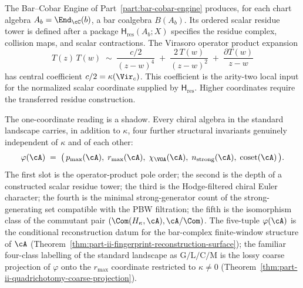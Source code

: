 The Bar--Cobar Engine of Part~\ref{part:bar-cobar-engine} produces, for
each chart algebra $A_b = \End_\cC(b)$, a bar coalgebra $B(A_b)$.
Its ordered scalar residue tower is defined after a package
$\mathsf H_{\mathrm{res}}(A_b;X)$ specifies the residue complex,
collision maps, and scalar contractions.  The Virasoro operator
product expansion
\begin{equation}
 T(z)\,T(w) \;\sim\; \frac{c/2}{(z-w)^4}
 \;+\; \frac{2\,T(w)}{(z-w)^2}
 \;+\; \frac{\partial T(w)}{z-w}
\end{equation}
has central coefficient $c/2=\kappa(\Vir_c)$.  This coefficient is the
arity-two local input for the normalized scalar coordinate supplied by
$\mathsf H_{\mathrm{res}}$.  Higher coordinates require the transferred
residue construction.

The one-coordinate reading is a shadow. Every chiral algebra in
the standard landscape carries, in addition to $\kappa$, four
further structural invariants genuinely independent of $\kappa$ and
of each other:
\begin{equation}
 \varphi(\cA) \;=\; \bigl(\,p_{\max}(\cA),\; r_{\max}(\cA),\;
 \chi_{\VOA}(\cA),\; n_{\mathrm{strong}}(\cA),\;
 \mathrm{coset}(\cA)\,\bigr).
 \label{eq:part-ii-fingerprint}
\end{equation}
The first slot is the operator-product pole order; the second is
the depth of a constructed scalar residue tower; the third is the
Hodge-filtered chiral Euler character;
the fourth is the minimal strong-generator count of the
strong-generating set compatible with the PBW filtration; the fifth
is the isomorphism class of the commutant pair
$(\Com(H_\kappa, \cA), \cA/\Com)$. The five-tuple $\varphi(\cA)$
is the conditional reconstruction datum for the bar-complex
finite-window structure of $\cA$
(Theorem~\ref{thm:part-ii-fingerprint-reconstruction-surface}); the
familiar four-class labelling of the standard landscape as
$\mathrm{G}/\mathrm{L}/\mathrm{C}/\mathrm{M}$ is the lossy coarse
projection of $\varphi$ onto the $r_{\max}$ coordinate restricted
to $\kappa \ne 0$ (Theorem~\ref{thm:part-ii-quadrichotomy-coarse-projection}).

